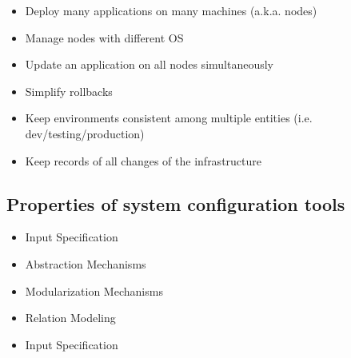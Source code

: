 	\begin{itemize}
		\item Deploy many applications on many machines (a.k.a. nodes)
		\item Manage nodes with different OS
		\item Update an application on all nodes simultaneously
		\item Simplify rollbacks
		\item Keep environments consistent among multiple entities (i.e. dev/testing/production)
		\item Keep records of all changes of the infrastructure
	\end{itemize}
	
\subsection{Properties of system configuration tools}

	\begin{itemize}
	\item Input Specification
	\item Abstraction Mechanisms
	\item Modularization Mechanisms
	\item Relation Modeling
	\item Input Specification
	\end{itemize}
